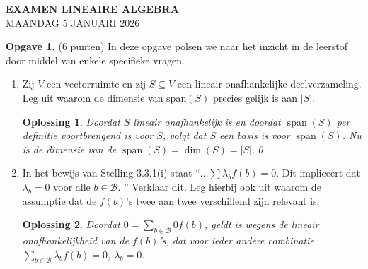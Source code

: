 \documentclass[a4paper,12pt]{article}
\newtheorem{oplossing}{Oplossing}
\begin{document}
\begin{center}
    \Large\textbf{EXAMEN LINEAIRE ALGEBRA} \\[0.5cm]
    \large\textsc{MAANDAG 5 JANUARI 2026} \\[0.5cm]
\end{center}


\textbf{Opgave 1.} (6 punten) In deze opgave polsen we naar het inzicht in de leerstof door middel van enkele specifieke vragen.
\begin{enumerate}
    \item[(i)] Zij $V$ een vectorruimte en zij $S \subseteq V$ een lineair onafhankelijke deelverzameling.
    Leg uit waarom de dimensie van $\text{span}(S)$ precies gelijk is aan $|S|$.
    \begin{oplossing}
        Doordat \(S\) lineair onafhankelijk is en doordat \(\operatorname{span}(S)\) per definitie voortbrengend is voor \(S\),
        volgt dat \(S\) een basis is voor \(\operatorname{span}(S)\). Nu is de dimensie van de \(\operatorname{span}(S) = \dim (S) = |S|\).\qed
    \end{oplossing}
    \item[(ii)] In het bewijs van Stelling 3.3.1(i) staat ``$\dots \sum \lambda_{b}f(b)=0$. Dit impliceert dat $\lambda_{b}=0$ voor alle $b \in \mathcal{B}$.
    '' Verklaar dit. Leg hierbij ook uit waarom de assumptie dat de $f(b)$'s twee aan twee verschillend zijn relevant is.
    \begin{oplossing}
       Doordat \(0= \sum_{b \in \mathcal{B}} 0 f(b)\), geldt is wegens de lineair onafhankelijkheid van de \(f(b)\)'s, dat voor ieder andere combinatie \( \sum_{b \in \mathcal{B}}  \lambda_b f(b) = 0\), \(\lambda_b = 0\).
       

\end{oplossing}
\end{enumerate}
\end{document}
